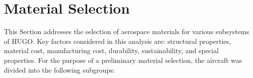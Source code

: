 \section{Material Selection}
\label{sec:Material_Selection}

This Section addresses the selection of aerospace materials for various subsystems of HUGO. Key factors considered in this analysis are: structural properties, material cost, manufacturing cost, durability, sustainability, and special properties. For the purpose of a preliminary material selection, the aircraft was divided into the following subgroups:



